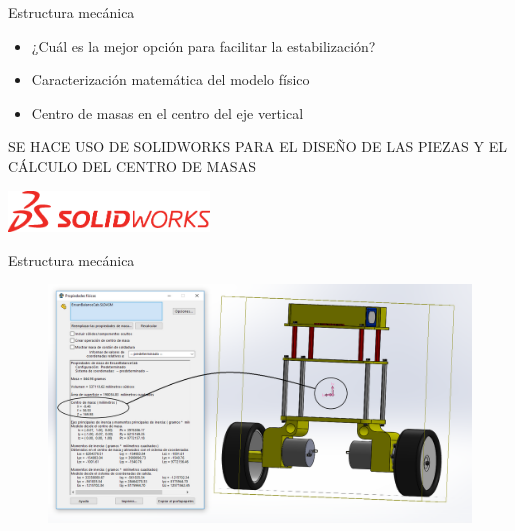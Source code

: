 \documentclass{beamer}
\begin{document}
\begin{frame}{Estructura mecánica}
	\begin{block}{}	
		\begin{itemize}
			\item ¿Cuál es la mejor opción para facilitar la estabilización? \pause
			\item Caracterización matemática del modelo físico \pause
			\item Centro de masas en el centro del eje vertical \pause
		\end{itemize}
	\end{block}
	\begin{alertblock}{}
		SE HACE USO DE SOLIDWORKS PARA EL DISEÑO DE LAS PIEZAS Y EL CÁLCULO DEL CENTRO DE MASAS
		\begin{center}
			\includegraphics [width =0.4\textwidth ]{imagenes/SolidWorks-01}
		\end{center}
	\end{alertblock}


\end{frame}

\begin{frame}{Estructura mecánica}
	\begin{figure}[H]
		\center
		\includegraphics[scale=0.3]{imagenes/Balancing_robot/center_mass}
	\end{figure}
\end{frame}
\end{document}

